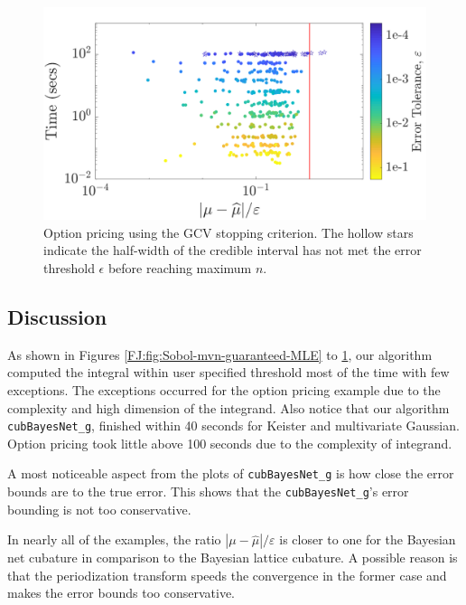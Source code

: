 \documentclass[graybox,footinfo]{svmult}
\newcommand{\abs}[1]{\left\lvert #1 \right\rvert} %
\newcommand{\FJHNote}[1]{{\textcolor{blue}{FJH: #1}}}
\newcommand{\JRNote}[1]{{\textcolor{green}{JR: #1}}}
\begin{document}
\begin{figure}
\centering
\includegraphics[width=0.95\linewidth]{"figures/Sobol/Sobol_optPrice_guaranteed_time_GCV__d12_r1_2019-Sep-1"}
\caption[Sobol: Option pricing guaranteed: GCV]{Option pricing using the GCV stopping criterion. The hollow stars indicate the half-width of the credible interval has not met the error threshold $\epsilon$ before reaching maximum $n$.}
\label{FJ:fig:Sobol-optprice-guaranteed-GCV}
\end{figure}




\subsection{Discussion}

As shown in Figures \ref{FJ:fig:Sobol-mvn-guaranteed-MLE} to \ref{FJ:fig:Sobol-optprice-guaranteed-GCV}, our algorithm computed the integral within user specified threshold most of the time with few exceptions. The exceptions occurred for the  option pricing example due to the complexity and high dimension of the integrand. 
Also notice that our algorithm \texttt{cubBayesNet\_g}, finished within 40 seconds for Keister and multivariate Gaussian. Option pricing took little above 100 seconds due to the complexity of integrand.

A most noticeable aspect from the plots of \texttt{cubBayesNet\_g} is how close the error bounds are to the true error. 
This shows that the \texttt{cubBayesNet\_g}'s error bounding is not too conservative.

In nearly all of the examples, the ratio $\abs{\mu - \widehat{\mu}}/\varepsilon$  is closer to one for the Bayesian net cubature in comparison to the Bayesian lattice cubature.  
A possible reason is that the periodization transform speeds the convergence in the former case and makes the error bounds too conservative.
\end{document}
